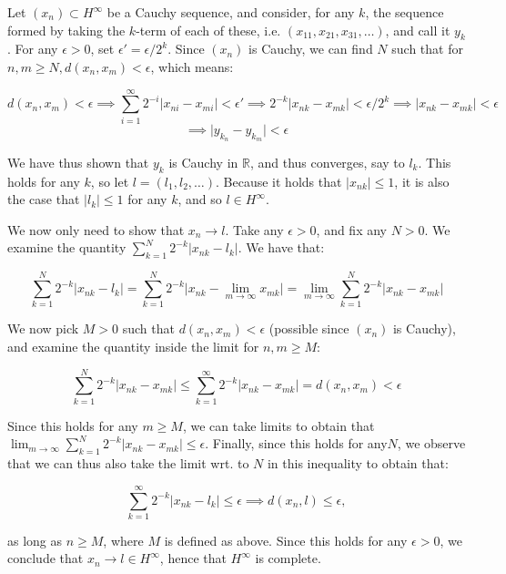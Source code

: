\begin{solution}
    
    Let $(x_n) \subset H^{\infty}$ be a Cauchy sequence, and consider, for any $k$, the sequence formed by taking the $k$-term of each of these, i.e. $(x_{11}, x_{21}, x_{31}, \ldots)$, and call it $y_k$.
    For any $\epsilon > 0$, set $\epsilon' = \epsilon/2^k$.
    Since $(x_n)$ is Cauchy, we can find $N$ such that for $n, m \geq N, d(x_n, x_m) < \epsilon$, which means:

    \[d(x_n, x_m) < \epsilon \implies \sum_{i=1}^{\infty} 2^{-i} \lvert x_{ni} - x_{mi} \rvert < \epsilon' \implies 2^{-k} \lvert x_{nk} - x_{mk} \rvert < \epsilon/2^{k} \implies \lvert x_{nk} - x_{mk} \rvert < \epsilon\]
    \[\implies \lvert y_{k_n} - y_{k_m} \rvert < \epsilon\]

    We have thus shown that $y_k$ is Cauchy in $\mathbb{R}$, and thus converges, say to $l_k$.
    This holds for any $k$, so let $l = (l_1, l_2, \ldots)$.
    Because it holds that $\lvert x_{nk} \rvert \leq 1$, it is also the case that $\lvert l_k \rvert \leq 1$ for any $k$, and so $l \in H^{\infty}$.

    We now only need to show that $x_n \rightarrow l$.
    Take any $\epsilon > 0$, and fix any $N > 0$.
    We examine the quantity $\sum_{k=1}^{N} 2^{-k} \lvert x_{nk} - l_k \rvert$.
    We have that:

    \[\sum_{k=1}^{N} 2^{-k} \lvert x_{nk} - l_k \rvert = \sum_{k=1}^{N} 2^{-k}\lvert x_{nk} - \lim_{m \rightarrow \infty} x_{mk} \rvert = \lim_{m \rightarrow \infty} \sum_{k=1}^{N} 2^{-k} \lvert x_{nk} - x_{mk} \rvert\]

    We now pick $M > 0$ such that $d(x_n, x_m) < \epsilon$ (possible since $(x_n)$ is Cauchy), and examine the quantity inside the limit for $n, m \geq M$:

    \[\sum_{k=1}^{N} 2^{-k} \lvert x_{nk} - x_{mk} \rvert \leq \sum_{k=1}^{\infty} 2^{-k} \lvert x_{nk} - x_{mk} \rvert = d(x_n, x_m) < \epsilon\]

    Since this holds for any $m \geq M$, we can take limits to obtain that $\lim_{m \rightarrow \infty} \sum_{k=1}^{N} 2^{-k} \lvert x_{nk} - x_{mk} \rvert \leq \epsilon$.
    Finally, since this holds for any$N$, we observe that we can thus also take the limit wrt. to $N$ in this inequality to obtain that:

    \[\sum_{k=1}^{\infty} 2^{-k} \lvert x_{nk} - l_k \rvert \leq \epsilon \implies d(x_n, l) \leq \epsilon,\]

    as long as $n \geq M$, where $M$ is defined as above.
    Since this holds for any $\epsilon > 0$, we conclude that $x_n \rightarrow l \in H^{\infty}$, hence that $H^{\infty}$ is complete.
\end{solution}

